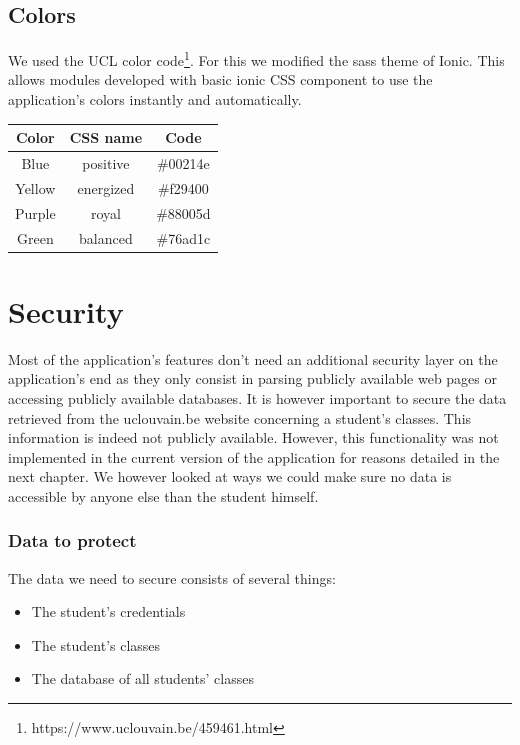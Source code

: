 \documentclass{eplmastersthesis}
\begin{document}
\subsection{Colors}
We used the UCL color code\footnote{https://www.uclouvain.be/459461.html}. For this we modified the sass theme of Ionic. This allows modules developed with basic ionic CSS component to use the application's colors instantly and automatically.

\begin{center}
    \begin{tabular}{ | c | c | c |}
    \hline
    Color & CSS name & Code\\ \hline
    Blue & positive & \#00214e\\ \hline
    Yellow & energized & \#f29400\\ \hline
    Purple & royal & \#88005d\\ \hline
    Green & balanced & \#76ad1c\\ \hline
    \end{tabular}
\end{center}

\section{Security}

Most of the application's features don't need an additional security layer on the application's end as they only consist in parsing publicly available web pages or accessing publicly available databases. It is however important to secure the data retrieved from the uclouvain.be website concerning a student's classes. This information is indeed not publicly available. However, this functionality was not implemented in the current version of the application for reasons detailed in the next chapter. We however looked at ways we could make sure no data is accessible by anyone else than the student himself.

\subsubsection{Data to protect}

The data we need to secure consists of several things:

\begin{itemize}
\item The student's credentials
\item The student's classes
\item The database of all students' classes
\end{itemize}
\end{document}
